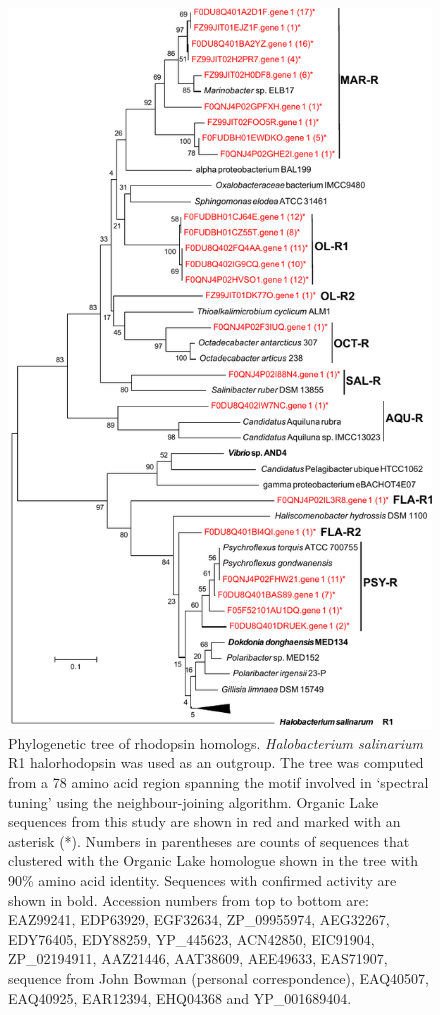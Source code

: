 \begin{figure}
\includegraphics[width=\textwidth]{orglake_figures/rhodopsin_tree.pdf}
\caption[Phylogenetic tree of rhodopsin homologues]{Phylogenetic tree of rhodopsin homologs. \emph{Halobacterium salinarium} R1 halorhodopsin was used as an outgroup. The tree was computed from a 78 amino acid region spanning the motif involved in `spectral tuning' using the neighbour-joining algorithm. Organic Lake sequences from this study are shown in red and marked with an asterisk (*). Numbers in parentheses are counts of sequences that clustered with the Organic Lake homologue shown in the tree with 90\% amino acid identity. Sequences with confirmed activity are shown in bold. Accession numbers from top to bottom are: EAZ99241, EDP63929, EGF32634, ZP\_09955974, AEG32267, EDY76405, EDY88259, YP\_445623, ACN42850, EIC91904, ZP\_02194911, AAZ21446, AAT38609, AEE49633, EAS71907, sequence from John Bowman (personal correspondence), EAQ40507, EAQ40925, EAR12394, EHQ04368 and YP\_001689404.}
\label{fig:rhodopsin_tree}

\end{figure}
